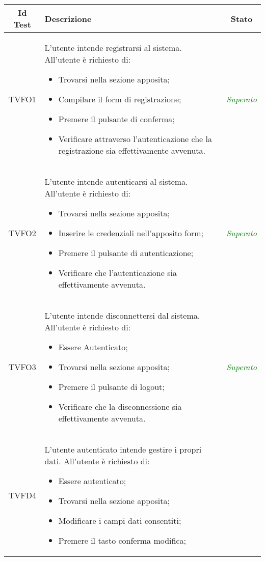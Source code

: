 \normalsize
\begin{longtable}[ht]{|c|>{}m{8cm}|c|}
\hline 
\textbf{Id Test} & \textbf{Descrizione} & \textbf{Stato}\\
\hline
\endhead
\hypertarget{TVFO1}{TVFO1} & L’utente intende registrarsi al sistema. All’utente è richiesto di:
\begin{itemize}
\item Trovarsi nella sezione apposita;
\item Compilare il form di registrazione;
\item Premere il pulsante di conferma;
\item Verificare attraverso l’autenticazione che la registrazione sia effettivamente avvenuta.
\end{itemize}
 & \textcolor{Green}{\textit{Superato}}\\ \hline
\hypertarget{TVFO2}{TVFO2} & L’utente intende autenticarsi al sistema. All’utente è richiesto di:
\begin{itemize}
\item Trovarsi nella sezione apposita;
\item Inserire le credenziali nell’apposito form;
\item Premere il pulsante di autenticazione;
\item Verificare che l’autenticazione sia effettivamente avvenuta.
\end{itemize}
 & \textcolor{Green}{\textit{Superato}}\\ \hline
\hypertarget{TVFO3}{TVFO3} & L’utente intende disconnettersi dal sistema. All’utente è richiesto di:
\begin{itemize}
\item Essere Autenticato;
\item Trovarsi nella sezione apposita;
\item Premere il pulsante di logout;
\item Verificare che la disconnessione sia effettivamente avvenuta.
\end{itemize}
 & \textcolor{Green}{\textit{Superato}}\\ \hline
\hypertarget{TVFD4}{TVFD4} & L’utente autenticato  intende gestire i propri dati. All’utente è richiesto di:
\begin{itemize}
\item Essere autenticato;
\item Trovarsi nella sezione apposita;
\item Modificare i campi dati consentiti;
\item Premere il tasto conferma modifica;

\end{itemize}
\end{longtable}
